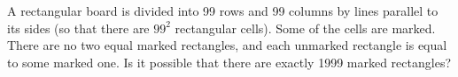 \problem
A rectangular board is divided into 99 rows and 99 columns by lines parallel to
its sides (so that there are $99 ^ 2$ rectangular cells).
Some of the cells are marked.
There are no two equal marked rectangles, and each unmarked rectangle is equal
to some marked one.
Is it possible that there are exactly 1999 marked rectangles?

\solution

\endproblem
